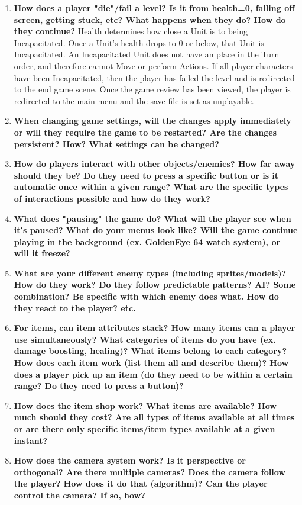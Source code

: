 \documentclass[12pt, titlepage]{article}
\begin{document}
\begin{enumerate}
	\item \textbf{How does a player "die"/fail a level? Is it from health=0, falling off screen, getting stuck, etc? What happens when they do? How do they continue?}
	Health determines how close a Unit is to being Incapacitated. Once a Unit’s health drops to 0 or below, that Unit is Incapacitated. An Incapacitated Unit does not have an place in the Turn order, and therefore cannot Move or perform Actions. If all player characters have been Incapacitated, then the player has failed the level and is redirected to the end game scene. Once the game review has been viewed, the player is redirected to the main menu and the save file is set as unplayable.
	\item \textbf{When changing game settings, will the changes apply immediately or will they require the game to be restarted? Are the changes persistent? How? What settings can be changed?}
	\item \textbf{How do players interact with other objects/enemies? How far away should they be? Do they need to press a specific button or is it automatic once within a given range? What are the specific types of interactions possible and how do they work?}
	\item \textbf{What does "pausing" the game do? What will the player see when it's paused? What do your menus look like? Will the game continue playing in the background (ex. GoldenEye 64 watch system), or will it freeze?}
	\item \textbf{What are your different enemy types (including sprites/models)? How do they work? Do they follow predictable patterns? AI? Some combination? Be specific with which enemy does what. How do they react to the player? etc.}
	\item \textbf{For items, can item attributes stack? How many items can a player use simultaneously? What categories of items do you have (ex. damage boosting, healing)? What items belong to each category? How does each item work (list them all and describe them)? How does a player pick up an item (do they need to be within a certain range? Do they need to press a button)?}
	\item \textbf{How does the item shop work? What items are available? How much should they cost? Are all types of items available at all times or are there only specific items/item types available at a given instant?}
	\item \textbf{How does the camera system work? Is it perspective or orthogonal? Are there multiple cameras? Does the camera follow the player? How does it do that (algorithm)? Can the player control the camera? If so, how?}

\end{enumerate}
\end{document}
